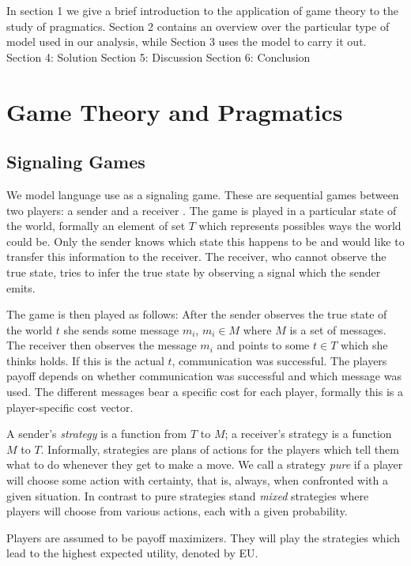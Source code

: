 \documentclass[10pt]{article}
\begin{document}
In section 1 we give a brief introduction to the application of game theory to the study of pragmatics.
Section 2 contains an overview over the particular type of model used in our analysis, while Section 3 uses the model to carry it out.
Section 4: Solution
Section 5: Discussion
Section 6: Conclusion

\section{Game Theory and Pragmatics}
\subsection{Signaling Games}
We model language use as a signaling game. These are sequential games between two players: a sender and a receiver \cite{david1969convention}. The game is played in a particular state of the world, formally an element of set $T$ which represents possibles ways the world could be. Only the sender knows which state this happens to be and would like to transfer this information to the receiver. The receiver, who cannot observe the true state, tries to infer the true state by observing a signal which the sender emits.

The game is then played as follows: After the sender observes the true state of the world $t$ she sends some message $m_i$, $m_i \in M$ where $M$ is a set of messages. The receiver then observes the message $m_i$ and points to some $t\in T$ which she thinks holds. If this is the actual $t$, communication was successful.
The players payoff depends on whether communication was successful and which message was used. The different messages bear a specific cost for each player, formally this is a player-specific cost vector.

A sender's \textit{strategy} is a function from $T$ to $M$; a receiver's strategy is a function $M$ to $T$. Informally, strategies are plans of actions for the players which tell them what to do whenever they get to make a move. We call a strategy \textit{pure} if a player will choose some action with certainty, that is, always, when confronted with a given situation. In contrast to pure strategies stand \textit{mixed} strategies where players will choose from various actions, each with a given probability.

Players are assumed to be payoff maximizers. They will play the strategies which lead to the highest expected utility, denoted by EU.
\end{document}
